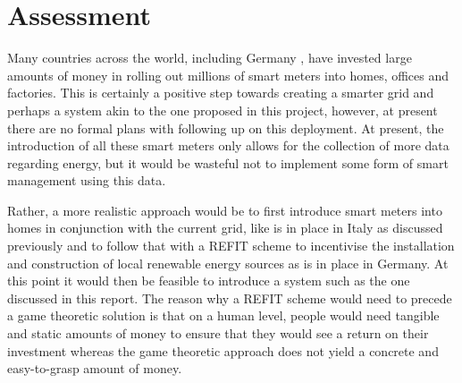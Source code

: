\documentclass[a4paper, notitlepage]{report}
\begin{document}
\chapter{Assessment}
\label{sec:org08b8dd7}
Many countries across the world, including Germany \cite{smartmetersgermany}, have
invested large amounts of money in rolling out millions of smart meters into
homes, offices and factories. This is certainly a positive step towards creating
a smarter grid and perhaps a system akin to the one proposed in this project,
however, at present there are no formal plans with following up on this
deployment. At present, the introduction of all these smart meters only allows
for the collection of more data regarding energy, but it would be wasteful not
to implement some form of smart management using this data.



Rather, a more realistic approach would be to first introduce smart meters into
homes in conjunction with the current grid, like is in place in Italy as
discussed previously and to follow that with a REFIT scheme to incentivise the
installation and construction of local renewable energy sources as is in place
in Germany. At this point it would then be feasible to introduce a system such
as the one discussed in this report. The reason why a REFIT scheme would need to
precede a game theoretic solution is that on a human level, people would need
tangible and static amounts of money to ensure that they would see a return on
their investment whereas the game theoretic approach does not yield a concrete
and easy-to-grasp amount of money.

\printbibliography[heading=bibintoc, title=References]
\appendix
{}
\end{document}

